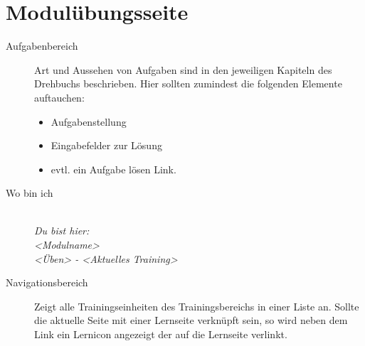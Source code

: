 %
%
%
\section{Modulübungsseite}
\label{sec:module-training-page}

\begin{description}
  \item[Aufgabenbereich] Art und Aussehen von Aufgaben sind in den jeweiligen Kapiteln des Drehbuchs beschrieben. Hier sollten zumindest die folgenden Elemente auftauchen:
  \begin{itemize}
    \item Aufgabenstellung
    \item Eingabefelder zur Lösung
    \item evtl. ein Aufgabe lösen Link.
  \end{itemize}
  \item[Wo bin ich] \emph{\\Du bist hier:\\<Modulname>\\<Üben> - <Aktuelles Training>}
  \item[Navigationsbereich] Zeigt alle Trainingseinheiten des Trainingsbereichs in einer Liste an. Sollte die aktuelle Seite mit einer Lernseite verknüpft sein, so wird neben dem Link ein Lernicon angezeigt 
  der auf die Lernseite verlinkt.
\end{description}



\endinput 
